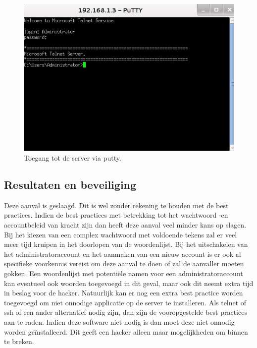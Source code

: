 \documentclass[pdftex,a4paper,12pt]{report}
\begin{document}
\begin{figure}[H]
\begin{center}
\includegraphics[scale=0.80]{img/HydraPutty}
\end{center}
\caption{Toegang tot de server via putty.}
\label{img:HydraPutty}
\end{figure}

\subsection{Resultaten en beveiliging}
Deze aanval is geslaagd. Dit is wel zonder rekening te houden met de best practices. Indien de best practices met betrekking tot het wachtwoord -en accountbeleid van kracht zijn dan heeft deze aanval veel minder kans op slagen. Bij het kiezen van een complex wachtwoord met voldoende tekens zal er veel meer tijd kruipen in het doorlopen van de woordenlijst. Bij het uitschakelen van het administratoraccount en het aanmaken van een nieuw account is er ook al specifieke voorkennis vereist om deze aanval te doen of zal de aanvaller moeten gokken. Een woordenlijst met potentiële namen voor een administratoraccount kan eventueel ook woorden toegevoegd in dit geval, maar ook dit neemt extra tijd in beslag voor de hacker. Natuurlijk kan er nog een extra best practice worden toegevoegd om niet onnodige applicatie op de server te installeren. Als telnet of ssh of een ander alternatief nodig zijn, dan zijn de vooropgestelde best practices aan te raden. Indien deze software niet nodig is dan moet deze niet onnodig worden geïnstalleerd. Dit geeft een hacker alleen maar mogelijkheden om binnen te breken.
\end{document}
